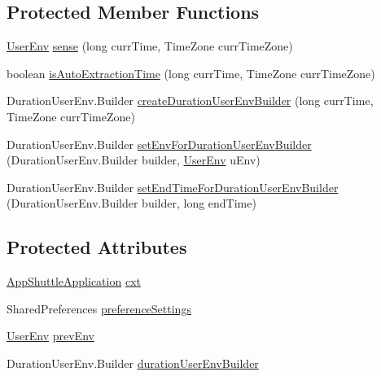 \subsection*{\-Protected \-Member \-Functions}
\begin{DoxyCompactItemize}
\item 
\hyperlink{classlab_1_1davidahn_1_1appshuttle_1_1collect_1_1env_1_1_user_env}{\-User\-Env} \hyperlink{classlab_1_1davidahn_1_1appshuttle_1_1collect_1_1env_1_1_base_env_sensor_a80cd864cc7e21f338ea4197665ee268e}{sense} (long curr\-Time, \-Time\-Zone curr\-Time\-Zone)
\item 
boolean \hyperlink{classlab_1_1davidahn_1_1appshuttle_1_1collect_1_1env_1_1_base_env_sensor_a506c557f0b5422beb2bf2cf34003b9bc}{is\-Auto\-Extraction\-Time} (long curr\-Time, \-Time\-Zone curr\-Time\-Zone)
\item 
\-Duration\-User\-Env.\-Builder \hyperlink{classlab_1_1davidahn_1_1appshuttle_1_1collect_1_1env_1_1_base_env_sensor_a7ba77af04528539a2c03808b96c47ea0}{create\-Duration\-User\-Env\-Builder} (long curr\-Time, \-Time\-Zone curr\-Time\-Zone)
\item 
\-Duration\-User\-Env.\-Builder \hyperlink{classlab_1_1davidahn_1_1appshuttle_1_1collect_1_1env_1_1_base_env_sensor_ad2800c98cf7d5d697e0340453a5e6893}{set\-Env\-For\-Duration\-User\-Env\-Builder} (\-Duration\-User\-Env.\-Builder builder, \hyperlink{classlab_1_1davidahn_1_1appshuttle_1_1collect_1_1env_1_1_user_env}{\-User\-Env} u\-Env)
\item 
\-Duration\-User\-Env.\-Builder \hyperlink{classlab_1_1davidahn_1_1appshuttle_1_1collect_1_1env_1_1_base_env_sensor_a2efb689c3d58caf33de1c4393909c418}{set\-End\-Time\-For\-Duration\-User\-Env\-Builder} (\-Duration\-User\-Env.\-Builder builder, long end\-Time)
\end{DoxyCompactItemize}
\subsection*{\-Protected \-Attributes}
\begin{DoxyCompactItemize}
\item 
\hyperlink{classlab_1_1davidahn_1_1appshuttle_1_1_app_shuttle_application}{\-App\-Shuttle\-Application} \hyperlink{classlab_1_1davidahn_1_1appshuttle_1_1collect_1_1env_1_1_base_env_sensor_ad2dbd9b532aeb77190431d4f785a3615}{cxt}
\item 
\-Shared\-Preferences \hyperlink{classlab_1_1davidahn_1_1appshuttle_1_1collect_1_1env_1_1_base_env_sensor_af0cc2d7b0fce698399a9b5944aa12cc3}{preference\-Settings}
\item 
\hyperlink{classlab_1_1davidahn_1_1appshuttle_1_1collect_1_1env_1_1_user_env}{\-User\-Env} \hyperlink{classlab_1_1davidahn_1_1appshuttle_1_1collect_1_1env_1_1_base_env_sensor_a6acb3d3703fc547f24051be83d4299e1}{prev\-Env}
\item 
\-Duration\-User\-Env.\-Builder \hyperlink{classlab_1_1davidahn_1_1appshuttle_1_1collect_1_1env_1_1_base_env_sensor_ab50acb342ce661544de93d82f435e67c}{duration\-User\-Env\-Builder}
\end{DoxyCompactItemize}
